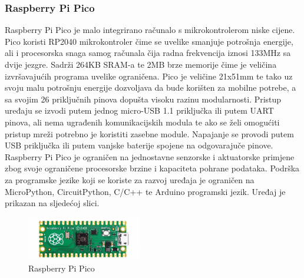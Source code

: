 \documentclass[times, utf8, diplomski]{fer}
\begin{document}
\subsubsection{Raspberry Pi Pico}
Raspberry Pi Pico\citep{RPiPico} je malo integrirano računalo s mikrokontrolerom niske cijene. Pico koristi RP2040 mikrokontroler čime se uvelike smanjuje potrošnja energije, ali i procesorska snaga samog računala čija radna frekvencija iznosi 133MHz sa dvije jezgre. Sadrži 264KB SRAM-a te 2MB brze memorije čime je veličina izvršavajućih programa uvelike ograničena. Pico je veličine 21x51mm te tako uz svoju malu potrošnju energije dozvoljava da bude korišten za mobilne potrebe, a sa svojim 26 priključnih pinova dopušta visoku razinu modularnosti. Pristup uređaju se izvodi putem jednog micro-USB 1.1 priključka ili putem UART pinova, ali nema ugrađenih komunikacijskih modula te ako se želi omogućiti pristup mreži potrebno je koristiti zasebne module. Napajanje se provodi putem USB priključka ili putem vanjske baterije spojene na odgovarajuče pinove. Raspberry Pi Pico je ograničen na jednostavne senzorske i aktuatorske primjene zbog svoje ograničene procesorske brzine i kapaciteta pohrane podataka. Podrška za programske jezike koji se koriste za razvoj uređaja je ograničen na MicroPython, CircuitPython, C/C++ te Arduino programski jezik. Uređaj je prikazan na sljedećoj slici.
\begin{figure}[htb]
    \centering
    \includegraphics[width=5cm]{images/rpipico.jpg}
    \caption{Raspberry Pi Pico\citep{RPiPicoImg}}
    \label{fig:rpipico}
\end{figure}
\end{document}

